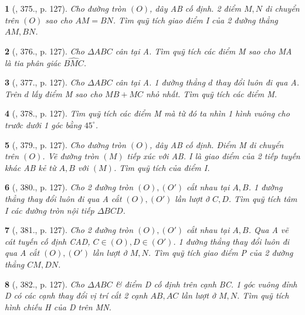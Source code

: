 \documentclass{article}
\newtheorem{baitoan}{}
\begin{document}
\begin{baitoan}[\cite{Binh_Toan_9_tap_2}, 375., p. 127]
	Cho đường tròn $(O)$, dây AB cố định. 2 điểm $M,N$ di chuyển trên $(O)$ sao cho $AM = BN$. Tìm quỹ tích giao điểm I của 2 đường thẳng $AM,BN$.
\end{baitoan}

\begin{baitoan}[\cite{Binh_Toan_9_tap_2}, 376., p. 127]
	Cho $\Delta ABC$ cân tại A. Tìm quỹ tích các điểm M sao cho MA là tia phân giác $\widehat{BMC}$.
\end{baitoan}

\begin{baitoan}[\cite{Binh_Toan_9_tap_2}, 377., p. 127]
	Cho $\Delta ABC$ cân tại A. 1 đường thẳng $d$ thay đổi luôn đi qua A. Trên $d$ lấy điểm M sao cho $MB + MC$ nhỏ nhất. Tìm quỹ tích các điểm M.
\end{baitoan}

\begin{baitoan}[\cite{Binh_Toan_9_tap_2}, 378., p. 127]
	Tìm quỹ tích các điểm M mà từ đó ta nhìn 1 hình vuông cho trước dưới 1 góc bằng $45^\circ$.
\end{baitoan}

\begin{baitoan}[\cite{Binh_Toan_9_tap_2}, 379., p. 127]
	Cho đường tròn $(O)$, dây AB cố định. Điểm M di chuyển trên $(O)$. Vẽ đường tròn $(M)$ tiếp xúc với AB. I là giao điểm của 2 tiếp tuyến khác AB kẻ từ $A,B$ với $(M)$. Tìm quỹ tích của điểm I.
\end{baitoan}

\begin{baitoan}[\cite{Binh_Toan_9_tap_2}, 380., p. 127]
	Cho 2 đường tròn $(O),(O')$ cắt nhau tại $A,B$. 1 đường thẳng thay đổi luôn đi qua A cắt $(O),(O')$ lần lượt ở $C,D$. Tìm quỹ tích tâm I các đường tròn nội tiếp $\Delta BCD$.
\end{baitoan}

\begin{baitoan}[\cite{Binh_Toan_9_tap_2}, 381., p. 127]
	Cho 2 đường tròn $(O),(O')$ cắt nhau tại $A,B$. Qua A vẽ cát tuyến cố định CAD, $C\in(O),D\in(O')$. 1 đường thẳng thay đổi luôn đi qua A cắt $(O),(O')$ lần lượt ở $M,N$. Tìm quỹ tích giao điểm P của 2 đường thẳng $CM,DN$.
\end{baitoan}

\begin{baitoan}[\cite{Binh_Toan_9_tap_2}, 382., p. 127]
	Cho $\Delta ABC$ \& điểm D cố định trên cạnh BC. 1 góc vuông đỉnh D có các cạnh thay đổi vị trí cắt 2 cạnh $AB,AC$ lần lượt ở $M,N$. Tìm quỹ tích hình chiếu H của D trên MN.
\end{baitoan}
\end{document}
